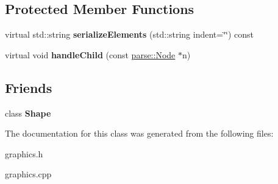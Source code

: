 \subsection*{Protected Member Functions}
\begin{DoxyCompactItemize}
\item 
\hypertarget{classg2c_1_1_geometry_ad2734a4bb00c779bcb2076671d8eba15}{
virtual std::string {\bfseries serializeElements} (std::string indent=\char`\"{}\char`\"{}) const }
\label{classg2c_1_1_geometry_ad2734a4bb00c779bcb2076671d8eba15}

\item 
\hypertarget{classg2c_1_1_geometry_ae074d5d8b972f3ad53ed42b381935f57}{
virtual void {\bfseries handleChild} (const \hyperlink{classparse_1_1_node}{parse::Node} $\ast$n)}
\label{classg2c_1_1_geometry_ae074d5d8b972f3ad53ed42b381935f57}

\end{DoxyCompactItemize}
\subsection*{Friends}
\begin{DoxyCompactItemize}
\item 
\hypertarget{classg2c_1_1_geometry_a1e1ef8352d0a310bace7f7a3307d1378}{
class {\bfseries Shape}}
\label{classg2c_1_1_geometry_a1e1ef8352d0a310bace7f7a3307d1378}

\end{DoxyCompactItemize}


The documentation for this class was generated from the following files:\begin{DoxyCompactItemize}
\item 
graphics.h\item 
graphics.cpp\end{DoxyCompactItemize}
